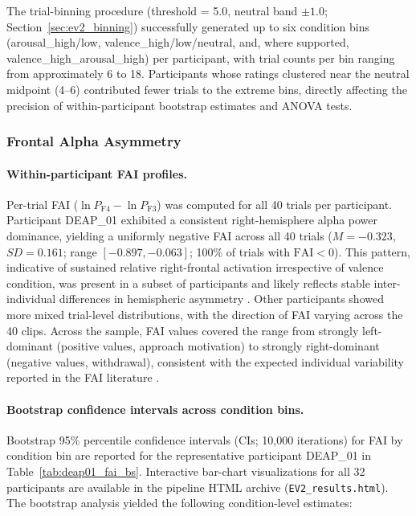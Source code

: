 The trial-binning procedure (threshold = 5.0, neutral band $\pm 1.0$; Section~\ref{sec:ev2_binning}) successfully generated up to six condition bins (arousal\_high/low, valence\_high/low/neutral, and, where supported, valence\_high\_arousal\_high) per participant, with trial counts per bin ranging from approximately 6 to 18. Participants whose ratings clustered near the neutral midpoint (4--6) contributed fewer trials to the extreme bins, directly affecting the precision of within-participant bootstrap estimates and \gls{ANOVA} tests.

\subsubsection{Frontal Alpha Asymmetry}

\paragraph{Within-participant \gls{FAI} profiles.}
Per-trial \gls{FAI} ($\ln P_{\text{F4}} - \ln P_{\text{F3}}$) was computed for all 40 trials per participant. Participant DEAP\_01 exhibited a consistent right-hemisphere alpha power dominance, yielding a uniformly negative \gls{FAI} across all 40 trials ($M = -0.323$, $SD = 0.161$; range $[-0.897, -0.063]$; 100\% of trials with $\text{FAI} < 0$). This pattern, indicative of sustained relative right-frontal activation irrespective of valence condition, was present in a subset of participants and likely reflects stable inter-individual differences in hemispheric asymmetry \parencite{allenIssuesAssumptionsRoad2004}. Other participants showed more mixed trial-level distributions, with the direction of \gls{FAI} varying across the 40 clips. Across the sample, \gls{FAI} values covered the range from strongly left-dominant (positive values, approach motivation) to strongly right-dominant (negative values, withdrawal), consistent with the expected individual variability reported in the \gls{FAI} literature \parencite{smithPrefrontalAsymmetryMeta2017}.

\paragraph{Bootstrap confidence intervals across condition bins.}
Bootstrap 95\% percentile confidence intervals (CIs; 10{,}000 iterations) for \gls{FAI} by condition bin are reported for the representative participant DEAP\_01 in Table~\ref{tab:deap01_fai_bs}. Interactive bar-chart visualizations for all 32 participants are available in the pipeline HTML archive (\texttt{EV2\_results.html}). The bootstrap analysis yielded the following condition-level estimates:

